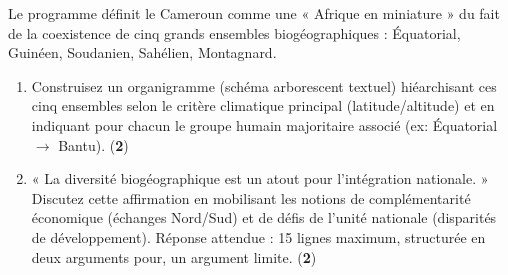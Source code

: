 \documentclass[11pt]{article}
\begin{document}
\begin{exercice}
\label{exo:synthese}
Le programme définit le Cameroun comme une « Afrique en miniature » du fait de la coexistence de cinq grands ensembles biogéographiques : Équatorial, Guinéen, Soudanien, Sahélien, Montagnard.

\begin{enumerate}
    \item Construisez un organigramme (schéma arborescent textuel) hiéarchisant ces cinq ensembles selon le critère climatique principal (latitude/altitude) et en indiquant pour chacun le groupe humain majoritaire associé (ex: Équatorial $\to$ Bantu). (\textbf{2})
    \item « La diversité biogéographique est un atout pour l'intégration nationale. » Discutez cette affirmation en mobilisant les notions de complémentarité économique (échanges Nord/Sud) et de défis de l'unité nationale (disparités de développement). Réponse attendue : 15 lignes maximum, structurée en deux arguments pour, un argument limite. (\textbf{2})
\end{enumerate}
\end{exercice}
\end{document}
